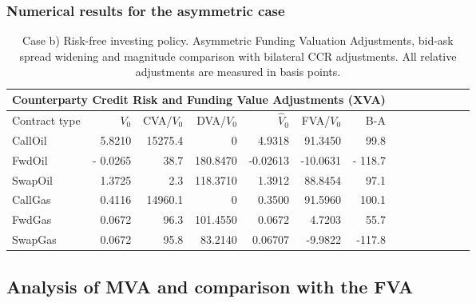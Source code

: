 \documentclass{beamer}
\begin{document}
\begin{frame}
\frametitle{Numerical results for the asymmetric case}
	\begin{table} [htbp]
	\centering
	\begin{tabular}{ |p{1.3  cm}| r|r|r|r|r|r|p{1 cm}|r| p{1 cm}| p{1.3cm}| 
	p{1 cm}| p{1.3 cm}| p{0.7 cm} |} 

 	\hline
 	\multicolumn{7}{|c|}{\textbf{Counterparty Credit Risk and Funding
	Value Adjustments (XVA) }} \\
 	\hline
	Contract type & $V_{0}$  &CVA/$V_{0}$ & DVA/$V_{0}$ &$\hat{V}_0$ &FVA/${V}_0$ & B-A\\
 	\hline

	CallOil &5.8210  &15275.4 &0  &4.9318 & 91.3450 & 99.8\\
	FwdOil &- 0.0265  &38.7 &180.8470 &-0.02613&-10.0631 & - 118.7\\
	SwapOil &1.3725  &2.3  &118.3710 &1.3912 &88.8454 &97.1\\
	CallGas &0.4116  &14960.1&0 &0.3500 &91.5960 & 100.1\\
	FwdGas &0.0672 &96.3 &101.4550& 0.0672 &4.7203 &55.7 \\
	SwapGas &0.0672  &95.8 &83.2140 & 0.06707 & -9.9822 & -117.8 \\
 	\hline
	\end{tabular}
	\caption{Case b) Risk-free investing policy. Asymmetric Funding Valuation Adjustments, bid-ask spread widening and magnitude comparison with bilateral CCR adjustments. All relative adjustments are measured in basis points.}

	\end{table}

\end{frame}


\subsection{Analysis of MVA and comparison with the FVA}
\end{document}
